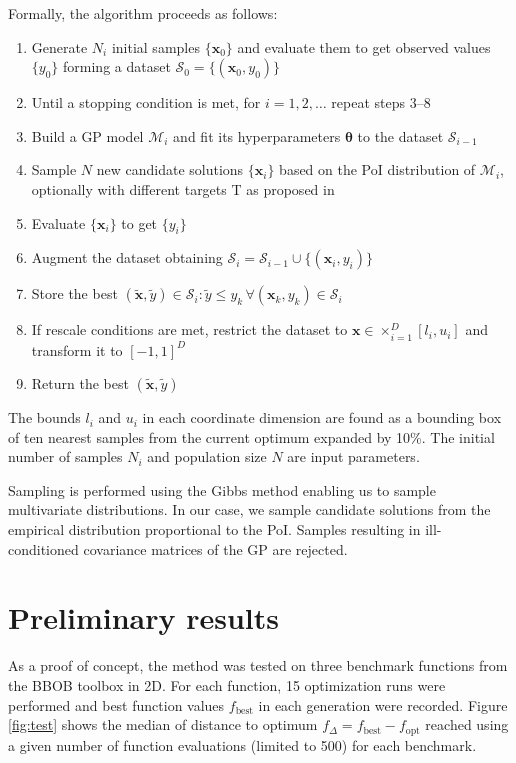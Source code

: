 \documentclass{sig-alternate}
\newcommand{\xx}{\mathrm{\mathbf{x}}}
\newcommand{\ttheta}{\mathbf{\theta}}
\begin{document}
Formally, the algorithm proceeds as follows:
\begin{enumerate}[itemsep=-4pt]
  \item Generate $N_i$ initial samples $\{\xx_0\}$ and evaluate them to get observed values $\{y_0\}$ forming a
    dataset $\mathcal{S}_0 = \{(\xx_0, y_0)\}$
  \item Until a stopping condition is met,  for $i = 1, 2, \dots$ repeat steps 3--8
  \item Build a GP model $\mathcal{M}_i$ and fit its hyperparameters $\ttheta$ to the dataset $\mathcal{S}_{i-1}$
  \item Sample $N$ new candidate solutions $\{\xx_i\}$ based on the PoI distribution of $\mathcal{M}_i$, 
    optionally with different targets T as proposed in \cite{jones01taxonomy}
  \item Evaluate $\{\xx_i\}$ to get $\{y_i\}$ 
  \item Augment the dataset obtaining $\mathcal{S}_i = \mathcal{S}_{i-1} \cup \{(\xx_i, y_i)\}$
  \item Store the best $(\tilde{\xx}, \tilde{y}) \in \mathcal{S}_i : \tilde{y} \leq y_k \, \forall (\xx_k, y_k) \in \mathcal{S}_i$  %
  \item If rescale conditions are met, restrict the dataset to $\xx \in \times_{i=1}^D [l_i, u_i]$ and
    transform it to $[-1, 1]^D$
  \item Return the best $(\tilde{\xx}, \tilde{y})$
\end{enumerate}
The bounds $l_i$ and $u_i$ in each coordinate dimension are found as a bounding box of ten nearest samples 
from the current optimum expanded by 10\%. The initial number of samples $N_i$ and population size $N$ are 
input parameters.

Sampling is performed using the Gibbs method \cite{geman1984stochastic} enabling us to sample multivariate 
distributions. In our case, we sample candidate solutions from  the empirical distribution proportional to 
the PoI. Samples resulting in ill-con\-di\-tion\-ed covariance matrices of the GP are rejected.

\section{Preliminary results}

As a proof of concept, the method was tested on three benchmark functions from the BBOB toolbox \cite{hansen2012fun} 
in 2D. For each function, 15 optimization runs were performed and best function values 
$f_{\text{best}}$ in each generation were recorded. Figure \ref{fig:test} shows the median of distance to optimum 
$f_{\Delta} = f_{\text{best}} - f_{\text{opt}}$ reached using a given number of function evaluations (limited to 500)
for each benchmark.
\end{document}
